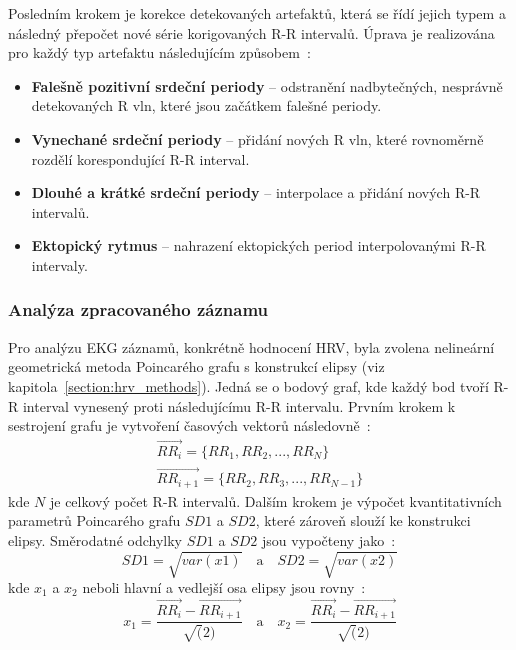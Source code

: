 Posledním krokem je korekce detekovaných artefaktů, která se řídí jejich typem a
následný přepočet nové série korigovaných R-R intervalů. Úprava je realizována
pro každý typ artefaktu následujícím způsobem~\cite{Lipponen2019}:
\begin{itemize}
    \item \textbf{Falešně pozitivní srdeční periody} -- odstranění
          nadbytečných, nesprávně detekovaných R vln, které jsou začátkem falešné
          periody.
    \item \textbf{Vynechané srdeční periody} -- přidání nových R vln, které
          rovnoměrně rozdělí korespondující R-R interval.
    \item \textbf{Dlouhé a krátké srdeční periody} -- interpolace a přidání
          nových R-R intervalů.
    \item \textbf{Ektopický rytmus} -- nahrazení ektopických period interpolovanými R-R intervaly.
\end{itemize}

\subsubsection{Analýza zpracovaného záznamu}
\label{section:analysis}
Pro analýzu EKG záznamů, konkrétně hodnocení HRV, byla zvolena nelineární
geometrická metoda Poincarého grafu s konstrukcí elipsy (viz
kapitola~\ref{section:hrv_methods}). Jedná se o bodový graf, kde každý bod tvoří
R-R interval vynesený proti následujícímu R-R intervalu. Prvním krokem k
sestrojení grafu je vytvoření časových vektorů následovně~\cite{Mazhar2007}:
\begin{gather}
    \overrightarrow{RR_i} = \{RR_1, RR_2,...,RR_{N}\} \\
    \overrightarrow{RR_{i+1}} = \{RR_2, RR_3,...,RR_{N-1}\}
\end{gather}
kde $N$ je celkový počet R-R intervalů. Dalším krokem je výpočet kvantitativních
parametrů Poincarého grafu $SD1$ a $SD2$, které zároveň slouží ke konstrukci
elipsy. Směrodatné odchylky $SD1$ a $SD2$ jsou vypočteny jako~\cite{Mazhar2007}:
\begin{equation}
    SD1 = \sqrt{var(x1)}
    \quad \textrm{a} \quad
    SD2 = \sqrt{var(x2)}
\end{equation}
kde $x_1$ a $x_2$ neboli hlavní a vedlejší osa elipsy jsou
rovny~\cite{Mazhar2007}:
\begin{equation}
    x_1 = \frac{\overrightarrow{RR_i}-\overrightarrow{RR_{i+1}}}{\sqrt(2)}
    \quad \textrm{a} \quad
    x_2 = \frac{\overrightarrow{RR_i}-\overrightarrow{RR_{i+1}}}{\sqrt(2)}
\end{equation}

